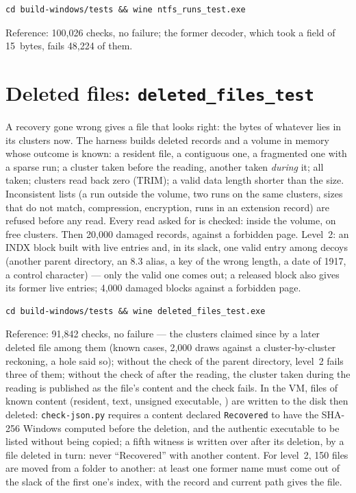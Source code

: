 \documentclass[11pt,a4paper,oneside]{report}
\begin{document}
\begin{lstlisting}
cd build-windows/tests && wine ntfs_runs_test.exe
\end{lstlisting}

Reference: 100,026 checks, no failure; the former decoder, which took a field
of 15~bytes, fails 48,224 of them.

\section{Deleted files: \texttt{deleted\_files\_test}}

A recovery gone wrong gives a file that looks right: the bytes of whatever
lies in its clusters now. The harness builds deleted records and a volume in
memory whose outcome is known: a resident file, a contiguous one, a fragmented
one with a sparse run; a cluster taken before the reading, another taken
\emph{during} it; all taken; clusters read back zero (TRIM); a valid data
length shorter than the size. Inconsistent lists (a run outside the volume,
two runs on the same clusters, sizes that do not match, compression,
encryption, runs in an extension record) are refused before any read. Every
read asked for is checked: inside the volume, on free clusters. Then 20,000
damaged records, against a forbidden page. Level~2: an INDX block built with
live entries and, in its slack, one valid entry among decoys (another parent
directory, an 8.3 alias, a key of the wrong length, a date of 1917, a control
character) — only the valid one comes out; a released block also gives its
former live entries; 4,000 damaged blocks against a forbidden page.

\begin{lstlisting}
cd build-windows/tests && wine deleted_files_test.exe
\end{lstlisting}

Reference: 91,842 checks, no failure — the clusters claimed since by a later deleted file among them (known cases, 2,000 draws against a cluster-by-cluster reckoning, a hole said so); without the check of the parent
directory, level~2 fails three of them; without the check of 
after the reading, the cluster taken during the reading is published as the
file's content and the check fails. In the VM, files of known content
(resident, text, unsigned executable, ) are written to
the disk then deleted: \texttt{check-json.py} requires a content declared
\texttt{Recovered} to have the SHA-256 Windows computed before the deletion,
and the authentic executable to be listed without being copied; a fifth witness is written over after its deletion, by a file deleted in turn: never ``Recovered'' with another content. For level~2,
150 files are moved from a folder to another: at least one former name must
come out of the slack of the first one's index, with the record and current
path  gives the file.
\end{document}
